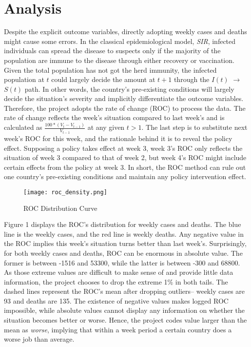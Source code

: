 \documentclass[12pt]{class}
\begin{document}
\section*{Analysis}
Despite the explicit outcome variables, directly adopting weekly cases and deaths might cause some errors. In the classical epidemiological model, \textit{SIR}, infected individuals can spread the disease to suspects only if the majority of the population are immune to the disease through either recovery or vaccination. Given the total population has not got the herd immunity, the infected population at $t$ could largely decide the amount at $t+1$ through the $I(t)$ $\to$ $S(t)$ path. In other words, the country’s pre-existing conditions will largely decide the situation’s severity and implicitly differentiate the outcome variables. Therefore, the project adopts the rate of change (ROC) to process the data. The rate of change reflects the week’s situation compared to last week’s and is calculated as  $\frac{100*(V_{t}- V_{t-1})}{V_{t-1}}$  at any given $t > 1$. The last step is to substitute next week’s ROC for this week, and the rationale behind it is to reveal the policy effect. Supposing a policy takes effect at week 3, week 3’s ROC only reflects the situation of week 3 compared to that of week 2, but week 4’s ROC might include certain effects from the policy at week 3. In short, the ROC method can rule out one country’s pre-existing conditions and maintain any policy intervention effect. \par 
\begin{figure}
    \centering
    \texttt{[image: roc\_density.png]}
    \caption{ROC Distribution Curve}
    \label{fig:my_label}
\end{figure}
Figure 1 displays the ROC’s distribution for weekly cases and deaths. The blue line is the weekly cases, and the red line is weekly deaths. Any negative value in the ROC implies this week’s situation turns better than last week’s. Surprisingly, for both weekly cases and deaths, ROC can be enormous in absolute value. The former is between -1516 and 53300, while the latter is between -300 and 68800. As those extreme values are difficult to make sense of and provide little data information, the project chooses to drop the extreme 1\% in both tails. The dashed lines represent the ROC’s mean after dropping outliers-- weekly cases are 93 and deaths are 135. The existence of negative values makes logged ROC impossible, while absolute values cannot display any information on whether the situation becomes better or worse. Hence, the project codes value larger than the mean as \textit{worse}, implying that within a week period a certain country does a worse job than average. \par 
\end{document}
